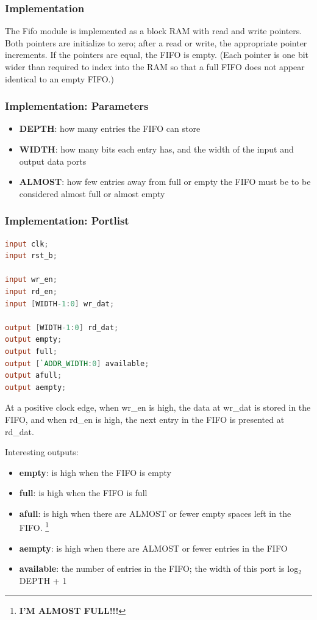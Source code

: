\documentclass[10pt]{report}
\begin{document}
\subsubsection{Implementation}

The Fifo module is implemented as a block RAM with read and write pointers.
Both pointers are initialize to zero; after a read or write, the appropriate
pointer increments. If the pointers are equal, the FIFO is empty. (Each
pointer is one bit wider than required to index into the RAM so that a full
FIFO does not appear identical to an empty FIFO.)

\subsubsection{Implementation: Parameters}

\begin{itemize}
\item{\textbf{DEPTH}: how many entries the FIFO can store}
\item{\textbf{WIDTH}: how many bits each entry has, and the width of the input and
output data ports}
\item{\textbf{ALMOST}: how few entries away from full or empty the FIFO must be to be
considered almost full or almost empty}
\end{itemize}

\subsubsection{Implementation: Portlist}
\begin{lstlisting}[basicstyle=\footnotesize,language=Verilog]
input clk;
input rst_b;
 
input wr_en;
input rd_en;
input [WIDTH-1:0] wr_dat;
 
output [WIDTH-1:0] rd_dat;
output empty;
output full;
output [`ADDR_WIDTH:0] available;
output afull;
output aempty;
\end{lstlisting}

At a positive clock edge, when wr\_en is high, the data at wr\_dat is stored
in the FIFO, and when rd\_en is high, the next entry in the FIFO is presented
at rd\_dat.

Interesting outputs:
\begin{itemize}
\item{\textbf{empty}: is high when the FIFO is empty}
\item{\textbf{full}: is high when the FIFO is full}
\item{\textbf{afull}: is high when there are ALMOST or fewer empty spaces left in the
FIFO. \footnote{\Huge{\textbf{I'M ALMOST FULL!!!}}} }
\item{\textbf{aempty}: is high when there are ALMOST or fewer entries in the FIFO}
\item{\textbf{available}: the number of entries in the FIFO; the width of this port is
log${}_2$ DEPTH + 1}
\end{itemize}
\end{document}
